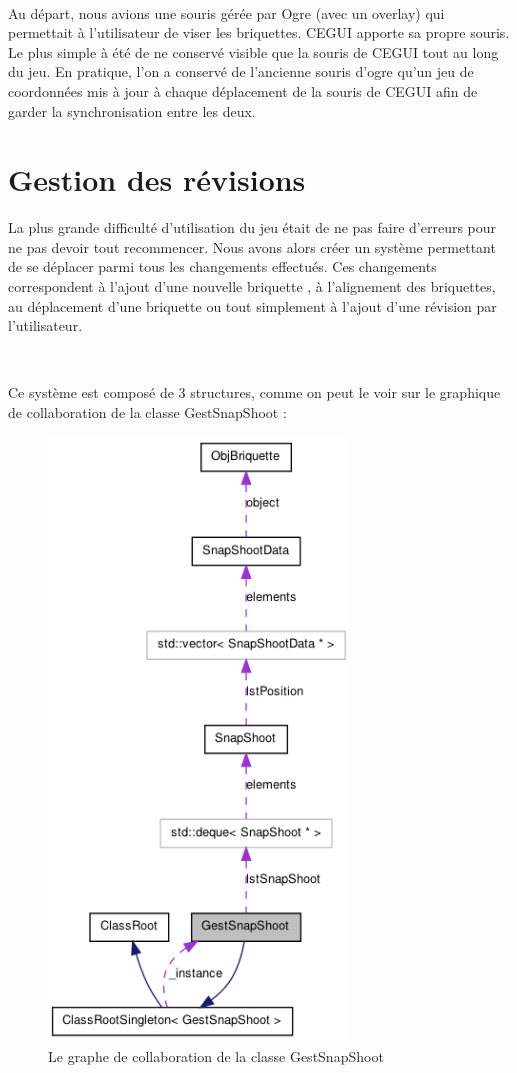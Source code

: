 \documentclass[frenchb,twoside]{EPURapport}
\begin{document}
		\

        Au départ, nous avions une souris gérée par Ogre (avec un overlay) qui
        permettait à l'utilisateur de viser les briquettes. CEGUI apporte sa
        propre souris. Le plus simple à été de ne conservé visible que la
        souris de CEGUI tout au long du jeu. En pratique, l'on a conservé de
        l'ancienne souris d'ogre qu'un jeu de coordonnées mis à jour à chaque
        déplacement de la souris de CEGUI afin de garder la synchronisation
        entre les deux.
        

    \section{Gestion des révisions}
    
		La plus grande difficulté d'utilisation du jeu était de ne pas faire
		d'erreurs pour ne pas devoir tout recommencer. Nous avons alors créer
		un système permettant de se déplacer parmi tous les changements effectués.
		Ces changements correspondent à l'ajout d'une nouvelle briquette
		, à l'alignement des briquettes, au déplacement d'une briquette
		ou tout simplement à l'ajout d'une révision par l'utilisateur.
		
		\
		
		Ce système est composé de 3 structures, comme on peut le voir
		 sur le graphique de collaboration de la classe GestSnapShoot :
		\begin{figure}[h]
			\centering
			\includegraphics[width=8cm]{images/graph_collaboration_gestsnapshoot.png}
			\caption{\label{fig:graph_collaboration_gestsnapshoot}Le graphe de collaboration de la classe GestSnapShoot}
		\end{figure}
		
\end{document}
